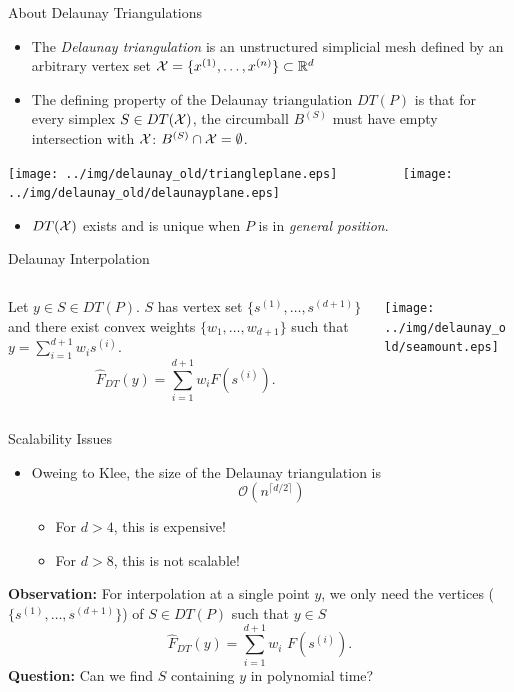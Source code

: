 \documentclass[aspectratio=169]{beamer}
\newcommand{\cmark}{\ding{51}}
\newcommand{\xmark}{\ding{55}}
\begin{document}
\begin{frame}{About Delaunay Triangulations}
\begin{itemize}
\item The {\it Delaunay triangulation} is an unstructured simplicial mesh
defined by an arbitrary vertex set
${\cal X} = \{x^{(1)}, \ldots, x^{(n)}\} \subset \mathbb{R}^d$
\item The defining property of the Delaunay triangulation $DT(P)$ is that
for every simplex $S \in DT({\cal X})$, the circumball $B^{(S)}$
must have empty intersection with ${\cal X}$:
$B^{(S)} \cap {\cal X} = \emptyset$.
\end{itemize}
\begin{center}
\texttt{[image: ../img/delaunay\_old/triangleplane.eps]}
\hskip 4pt{\color{red} \xmark}
$\qquad\qquad$
\texttt{[image: ../img/delaunay\_old/delaunayplane.eps]}
\hskip 4pt{\color{green} \cmark}
\end{center}
\begin{itemize}
\item $DT({\cal X})$ exists and is unique when $P$ is in {\it general position}.
\end{itemize}
\end{frame}

\begin{frame}{Delaunay Interpolation}
\begin{columns}
\begin{column}{.58\textwidth}
Let $y \in S \in DT(P)$.
$S$ has vertex set $\{s^{(1)}, \ldots, s^{(d+1)}\}$ and there exist
convex weights $\{w_1, \ldots, w_{d+1}\}$ such that
$y = \sum_{i=1}^{d+1} w_i s^{(i)}$.
$$
{\hat F}_{DT}(y) = \sum_{i=1}^{d+1} w_i F(s^{(i)}).
$$
\end{column}
\begin{column}{.38\textwidth}
\hbox{\texttt{[image: ../img/delaunay\_old/seamount.eps]}}
\end{column}
\end{columns}
\end{frame}
\begin{frame}{Scalability Issues}
\begin{itemize}
\item Oweing to Klee, the size of the Delaunay triangulation is
$$
\mathcal{O}\left(n^{\lceil d/2 \rceil}\right)
$$
\begin{itemize}
\item For $d > 4$, this is expensive!
\item For $d > 8$, this is not scalable!
\end{itemize}
\end{itemize}
\pause
{\textbf{Observation:}
For interpolation at a single point $y$, we only need the
vertices ($\{s^{(1)}, \ldots, s^{(d+1)}\}$) of $S \in DT(P)$
such that $y\in S$}
$$
{\hat F}_{DT}(y) = \sum_{i=1}^{d+1} w_i\text{~}F(s^{(i)}).
$$
\medskip
\pause
{\textbf{Question:} Can we find $S$ containing $y$ in polynomial time?}
\end{frame}
\end{document}
